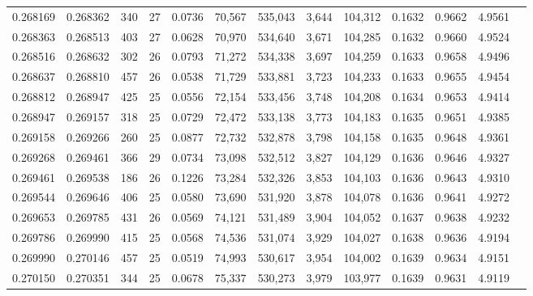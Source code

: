 \begin{tabular}{rrrrrrrrrrrrr}
0.268169 & 0.268362 &   340 &  27 &                                     0.0736 &  70,567 & 535,043 &   3,644 & 104,312 & 0.1632 & 0.9662 & 4.9561 \\
0.268363 & 0.268513 &   403 &  27 &                                     0.0628 &  70,970 & 534,640 &   3,671 & 104,285 & 0.1632 & 0.9660 & 4.9524 \\
0.268516 & 0.268632 &   302 &  26 &                                     0.0793 &  71,272 & 534,338 &   3,697 & 104,259 & 0.1633 & 0.9658 & 4.9496 \\
0.268637 & 0.268810 &   457 &  26 &                                     0.0538 &  71,729 & 533,881 &   3,723 & 104,233 & 0.1633 & 0.9655 & 4.9454 \\
0.268812 & 0.268947 &   425 &  25 &                                     0.0556 &  72,154 & 533,456 &   3,748 & 104,208 & 0.1634 & 0.9653 & 4.9414 \\
0.268947 & 0.269157 &   318 &  25 &                                     0.0729 &  72,472 & 533,138 &   3,773 & 104,183 & 0.1635 & 0.9651 & 4.9385 \\
0.269158 & 0.269266 &   260 &  25 &                                     0.0877 &  72,732 & 532,878 &   3,798 & 104,158 & 0.1635 & 0.9648 & 4.9361 \\
0.269268 & 0.269461 &   366 &  29 &                                     0.0734 &  73,098 & 532,512 &   3,827 & 104,129 & 0.1636 & 0.9646 & 4.9327 \\
0.269461 & 0.269538 &   186 &  26 &                                     0.1226 &  73,284 & 532,326 &   3,853 & 104,103 & 0.1636 & 0.9643 & 4.9310 \\
0.269544 & 0.269646 &   406 &  25 &                                     0.0580 &  73,690 & 531,920 &   3,878 & 104,078 & 0.1636 & 0.9641 & 4.9272 \\
0.269653 & 0.269785 &   431 &  26 &                                     0.0569 &  74,121 & 531,489 &   3,904 & 104,052 & 0.1637 & 0.9638 & 4.9232 \\
0.269786 & 0.269990 &   415 &  25 &                                     0.0568 &  74,536 & 531,074 &   3,929 & 104,027 & 0.1638 & 0.9636 & 4.9194 \\
0.269990 & 0.270146 &   457 &  25 &                                     0.0519 &  74,993 & 530,617 &   3,954 & 104,002 & 0.1639 & 0.9634 & 4.9151 \\
0.270150 & 0.270351 &   344 &  25 &                                     0.0678 &  75,337 & 530,273 &   3,979 & 103,977 & 0.1639 & 0.9631 & 4.9119 \\

\end{tabular}
